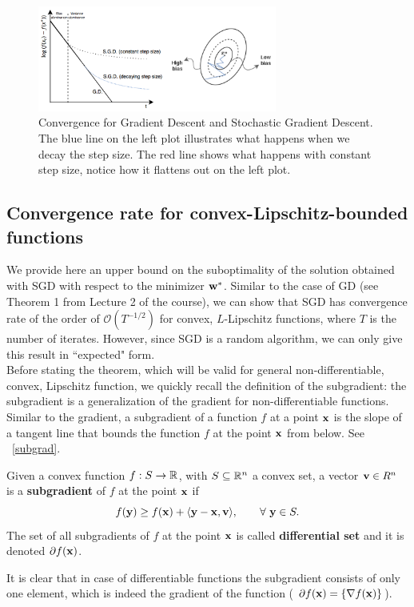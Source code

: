 \documentclass{article}
\begin{document}
\begin{figure}[H]
  \centering
  \includegraphics[width=0.7\textwidth]{images/gd_sgd_convergence.PNG}
  \caption{Convergence for Gradient Descent and Stochastic Gradient Descent. The blue line on the left plot illustrates what happens when we decay the step size. The red line shows what happens with constant step size, notice how it flattens out on the left plot.}
\end{figure}


\subsection{Convergence rate for convex-Lipschitz-bounded functions}\label{SGDbound}


We provide here an upper bound on the suboptimality of the solution obtained with SGD with respect to the minimizer ${\bf w}^\ast$. Similar to the case of GD (see Theorem 1 from Lecture 2 of the course), we can show that SGD has convergence rate of the order of $\mathcal{O}(T^{-1/2})$ for convex, $L$-Lipschitz functions, where $T$ is the number of iterates. However, since SGD is a random algorithm, we can only give this result in ``expected" form. \\


Before stating the theorem, which will be valid for general non-differentiable, convex, Lipschitz function, we quickly recall the definition of the subgradient: the subgradient is a generalization of the gradient for non-differentiable functions. Similar to the gradient, a subgradient of a function $f$ at a point ${\bf x}$ is the slope of a tangent line that bounds the function $f$ at the point ${\bf x}$ from below. See \figurename \ \ref{subgrad}. \\
\begin{defn}\label{subgraddefn}
Given a convex function $f:S\to\mathbb{R}$, with $S \subseteq \mathbb{R}^n$ a convex set, a vector ${\bf v} \in R^n$ is a {\bf subgradient} of $f$ at the point ${\bf x}$ if
$$ f({\bf y}) \geq f({\bf x}) + \langle {\bf y} - {\bf x}, {\bf v} \rangle, \qquad \forall \ {\bf y} \in S.$$
The set of all subgradients of $f$ at the point ${\bf x}$ is called {\bf differential set} and it is denoted $\partial f ({\bf x})$.
\end{defn}
It is clear that in case of differentiable functions the subgradient consists of only one element, which is indeed the gradient of the function ( $\partial f ({\bf x}) = \{ \nabla f({\bf x})\} $).\\
\end{document}
